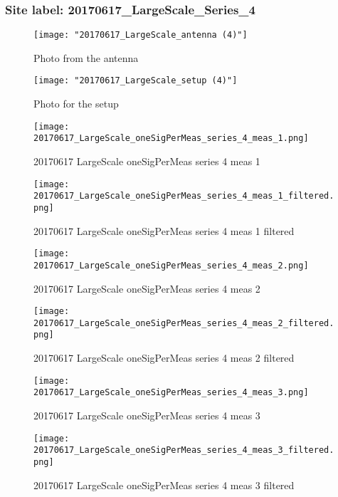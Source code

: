 \subsubsection{Site label: 20170617\_LargeScale\_Series\_4}
\begin{figure}[ht] \caption{Photo from the antenna}
\texttt{[image: "20170617\_LargeScale\_antenna (4)"]}\centering\end{figure}
\begin{figure}[ht] \caption{Photo for the setup}
\texttt{[image: "20170617\_LargeScale\_setup (4)"]}\centering\end{figure}
\begin{figure}[ht] \caption{20170617 LargeScale oneSigPerMeas series 4 meas 1}
\texttt{[image: 20170617\_LargeScale\_oneSigPerMeas\_series\_4\_meas\_1.png]}\centering\end{figure}
\begin{figure}[ht] \caption{20170617 LargeScale oneSigPerMeas series 4 meas 1 filtered}
\texttt{[image: 20170617\_LargeScale\_oneSigPerMeas\_series\_4\_meas\_1\_filtered.png]}\centering\end{figure}
\begin{figure}[ht] \caption{20170617 LargeScale oneSigPerMeas series 4 meas 2}
\texttt{[image: 20170617\_LargeScale\_oneSigPerMeas\_series\_4\_meas\_2.png]}\centering\end{figure}
\begin{figure}[ht] \caption{20170617 LargeScale oneSigPerMeas series 4 meas 2 filtered}
\texttt{[image: 20170617\_LargeScale\_oneSigPerMeas\_series\_4\_meas\_2\_filtered.png]}\centering\end{figure}
\begin{figure}[ht] \caption{20170617 LargeScale oneSigPerMeas series 4 meas 3}
\texttt{[image: 20170617\_LargeScale\_oneSigPerMeas\_series\_4\_meas\_3.png]}\centering\end{figure}
\begin{figure}[ht] \caption{20170617 LargeScale oneSigPerMeas series 4 meas 3 filtered}
\texttt{[image: 20170617\_LargeScale\_oneSigPerMeas\_series\_4\_meas\_3\_filtered.png]}\centering\end{figure}
\clearpage
